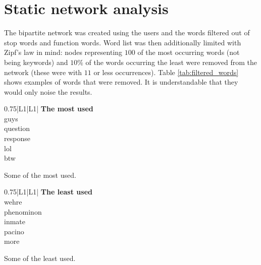 \newpage
\section{Static network analysis}

  The bipartite network was created using the users and the words filtered out of stop words and function words. Word list was then additionally limited with Zipf's law in mind: nodes representing $100$ of the most occurring words (not being keywords) and $10\%$ of the words occurring the least were removed from the network (these were with $11$ or less occurrences). Table \ref{tab:filtered_words} shows examples of words that were removed. It is understandable that they would only noise the results.  
  \begin{table}[H]
    \begin{subtable}{0.49\textwidth}
      \centering
      \begin{tabularx}{0.75\textwidth}{|L{1}|L{1}|} \hline
         \textbf{The most used} \\\hline
        guys \\
        question \\
        response \\
        lol \\
        btw \\
        \hline
      \end{tabularx}
      \caption{Some of the most used.}
      \label{tab:filtered_words_top}
    \end{subtable}
    \begin{subtable}{0.49\textwidth}
      \centering
      \begin{tabularx}{0.75\textwidth}{|L{1}|L{1}|} \hline
         \textbf{The least used} \\\hline
        wehre \\
        phenominon \\
        inmate \\
        pacino \\
        more \\
        \hline
      \end{tabularx}
      \caption{Some of the least used.}
      \label{tab:filtered_words_bottom}
    \end{subtable}
    \caption{Selected examples of the most and the least used non-keyword words.}
    \label{tab:filtered_words}
  \end{table}
  
